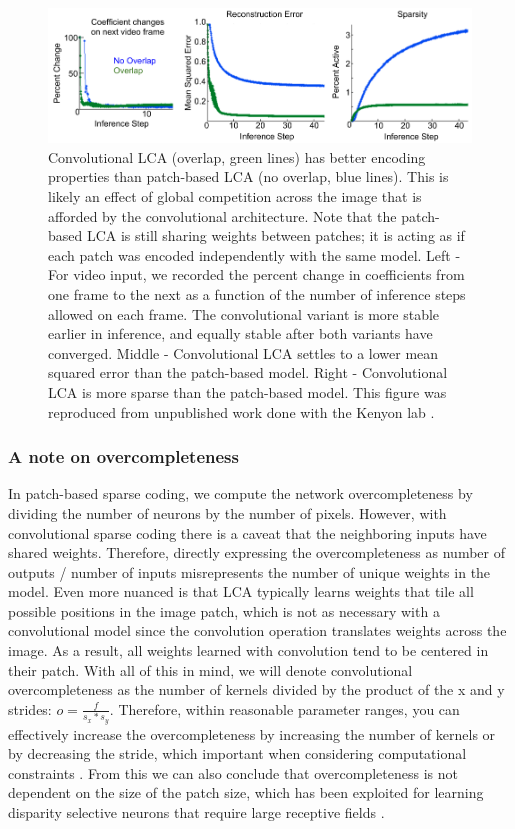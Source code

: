 \begin{figure}\label{fig:ch2_lca_conv_benefit}
    \centering
    \includegraphics[width=\textwidth]{figures/lca_conv_benefits.png}
    \caption{Convolutional LCA (overlap, green lines) has better encoding properties than patch-based LCA (no overlap, blue lines). This is likely an effect of global competition across the image that is afforded by the convolutional architecture. Note that the patch-based LCA is still sharing weights between patches; it is acting as if each patch was encoded independently with the same model. Left - For video input, we recorded the percent change in coefficients from one frame to the next as a function of the number of inference steps allowed on each frame. The convolutional variant is more stable earlier in inference, and equally stable after both variants have converged. Middle - Convolutional LCA settles to a lower mean squared error than the patch-based model. Right - Convolutional LCA is more sparse than the patch-based model. This figure was reproduced from unpublished work done with the Kenyon lab \citeyearpar{paiton2013deep}.}
\end{figure}


\subsubsection{A note on overcompleteness}
In patch-based sparse coding, we compute the network overcompleteness by dividing the number of neurons by the number of pixels. However, with convolutional sparse coding there is a caveat that the neighboring inputs have shared weights. Therefore, directly expressing the overcompleteness as number of outputs / number of inputs misrepresents the number of unique weights in the model. Even more nuanced is that LCA typically learns weights that tile all possible positions in the image patch, which is not as necessary with a convolutional model since the convolution operation translates weights across the image. As a result, all weights learned with convolution tend to be centered in their patch. With all of this in mind, we will denote convolutional overcompleteness as the number of kernels divided by the product of the x and y strides: $o = \tfrac{f}{s_{x}*s_{y}}$. Therefore, within reasonable parameter ranges, you can effectively increase the overcompleteness by increasing the number of kernels or by decreasing the stride, which important when considering computational constraints \parencite{schultz2014replicating}. From this we can also conclude that overcompleteness is not dependent on the size of the patch size, which has been exploited for learning disparity selective neurons that require large receptive fields \parencite{lundquist2016sparse}.


